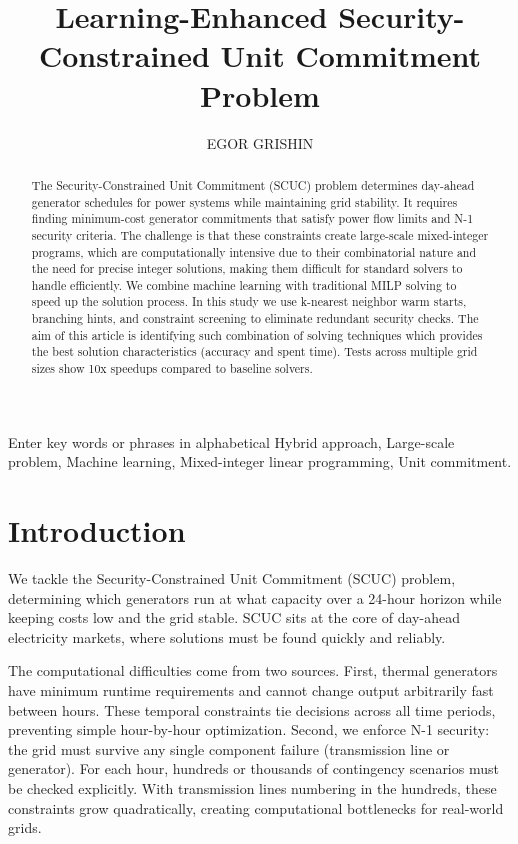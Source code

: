 \documentclass{ieeeaccess}
\begin{document}

\title{Learning-Enhanced Security-Constrained Unit Commitment Problem}
\author{\uppercase{Egor Grishin}}
\address[1]{Center for Energy Science and Technology, Moscow, Russia}
\begin{abstract}
The Security-Constrained Unit Commitment (SCUC) problem determines day-ahead generator schedules for power systems while maintaining grid stability. It requires finding minimum-cost generator commitments that satisfy power flow limits and N-1 security criteria. The challenge is that these constraints create large-scale mixed-integer programs, which are computationally intensive due to their combinatorial nature and the need for precise integer solutions, making them difficult for standard solvers to handle efficiently. We combine machine learning with traditional MILP solving to speed up the solution process. In this study we use k-nearest neighbor warm starts, branching hints, and constraint screening to eliminate redundant security checks. The aim of this article is identifying such combination of solving techniques which provides the best solution characteristics (accuracy and spent time). Tests across multiple grid sizes show 10x speedups compared to baseline solvers.
\end{abstract}

\begin{keywords}
Enter key words or phrases in alphabetical
Hybrid approach, Large-scale problem, Machine learning, Mixed-integer linear programming, Unit commitment.
\end{keywords}
\titlepgskip=-21pt

\maketitle
\section{Introduction}
We tackle the Security-Constrained Unit Commitment (SCUC) problem, determining which generators run at what capacity over a 24-hour horizon while keeping costs low and the grid stable. SCUC sits at the core of day-ahead electricity markets, where solutions must be found quickly and reliably.

The computational difficulties come from two sources. First, thermal generators have minimum runtime requirements and cannot change output arbitrarily fast between hours. These temporal constraints tie decisions across all time periods, preventing simple hour-by-hour optimization. Second, we enforce N-1 security: the grid must survive any single component failure (transmission line or generator). For each hour, hundreds or thousands of contingency scenarios must be checked explicitly. With transmission lines numbering in the hundreds, these constraints grow quadratically, creating computational bottlenecks for real-world grids.
\end{document}
